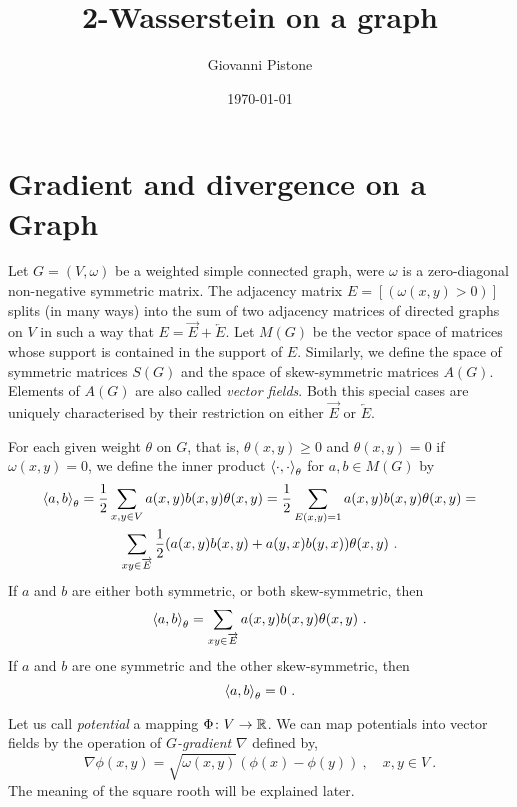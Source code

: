 \documentclass[12pt,a4paper]{amsart}
\title{2-Wasserstein on a graph}
\author{Giovanni Pistone}
\date{\today}
\begin{document}
\maketitle

\section{Gradient and divergence on a Graph}

Let $G = (V,\omega)$ be a weighted simple connected graph, were
$\omega$ is a zero-diagonal non-negative symmetric matrix. The
adjacency matrix $E = [(\omega(x,y) > 0)]$ splits (in many ways) into
the sum of two adjacency matrices of directed graphs on $V$ in such a
way that $E = \overrightarrow E + \overleftarrow E$. Let $M(G)$ be the
vector space of matrices whose support is contained in the support of
$E$. Similarly, we define the space of symmetric matrices $S(G)$ and
the space of skew-symmetric matrices $A(G)$. Elements of $A(G)$ are
also called \emph{vector fields}. Both this special cases are uniquely
characterised by their restriction on either $\overrightarrow E$ or
$\overleftarrow E$.

For each given weight $\theta$ on $G$, that is, $\theta(x,y) \geq 0$ and
$\theta(x,y) = 0$ if $\omega(x,y) = 0$, we define the  inner product $\left\langle\cdot,\cdot\right\rangle_{\theta}$
for $a,b \in M(G)$ by
\begin{multline*}
  \left\langle a,b\right\rangle_{\theta} = \frac 12 \sum _ {x,y \in V} 
  a(x,y) b(x,y)\theta(x,y) = \frac 12 \sum _ {E(x,y)=1} a(x,y)
  b(x,y)\theta(x,y) = \\ \sum_{xy \in \overrightarrow E} 
  \frac12(a(x,y)b(x,y)+a(y,x)b(y,x)) \theta(x,y)\ . 
\end{multline*}
If $a$ and $b$ are either both symmetric, or both skew-symmetric, then
\begin{equation*}
  \left\langle a,b\right\rangle_{\theta} = \sum_{xy \in \overrightarrow E}
  a(x,y)b(x,y) \theta(x,y) \ .
\end{equation*}
If $a$ and $b$ are one symmetric and the other skew-symmetric, then
\begin{equation*}
  \left\langle a,b\right\rangle_{\theta} = 0 \ .
\end{equation*}

Let us call \emph{potential} a mapping $\Phi \colon V \to \mathbb{R}$. We
can map potentials into vector fields by the operation of
\emph{$G$-gradient} $\nabla$ defined by,
\begin{equation*}
  \nabla \phi(x,y) = \sqrt {\omega(x,y)} (\phi(x) - \phi(y)) \ , \quad
  x,y \in V \ .
\end{equation*}
The meaning of the square rooth will be explained later.
\end{document}
